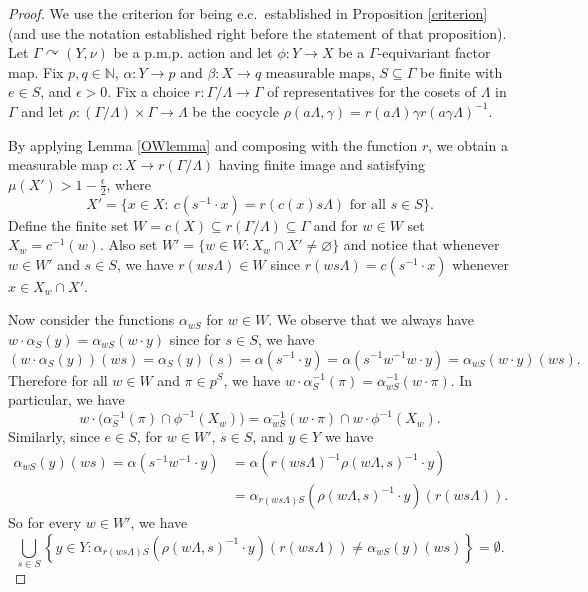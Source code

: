 \documentclass[12pt]{amsart}
\theoremstyle{definition}
\newcommand\bN{{\mathbb N}}
\newcommand{\pmp}{p{$.$}m{$.$}p{$.$}}
\newcommand{\acts}{\curvearrowright}
\begin{document}
\begin{proof}
We use the criterion for being e.c.\ established in Proposition \ref{criterion} (and use the notation established right before the statement of that proposition).  Let $\Gamma \acts (Y, \nu)$ be a {\pmp} action and let $\phi : Y \rightarrow X$ be a $\Gamma$-equivariant factor map. Fix $p, q \in \bN$, $\alpha : Y \rightarrow p$ and $\beta : X \rightarrow q$ measurable maps, $S \subseteq \Gamma$ be finite with $e \in S$, and $\epsilon > 0$. Fix a choice $r : \Gamma / \Lambda \rightarrow \Gamma$ of representatives for the cosets of $\Lambda$ in $\Gamma$ and let $\rho : (\Gamma / \Lambda) \times \Gamma \rightarrow \Lambda$ be the cocycle $\rho(a \Lambda, \gamma) = r(a \Lambda) \gamma r(a \gamma \Lambda)^{-1}$.

By applying Lemma \ref{OWlemma} and composing with the function $r$, we obtain a measurable map $c : X \rightarrow r(\Gamma / \Lambda)$ having finite image and satisfying $\mu(X') > 1 - \frac{\epsilon}{2}$, where
$$X' = \{x \in X : \ c(s^{-1} \cdot x) = r(c(x) s \Lambda) \text{ for all }s\in S\}.$$
Define the finite set $W = c(X) \subseteq r(\Gamma / \Lambda) \subseteq \Gamma$ and for $w \in W$ set $X_w = c^{-1}(w)$. Also set $W' = \{w \in W : X_w \cap X' \neq \varnothing\}$ and notice that whenever $w \in W'$ and $s \in S$, we have $r(w s \Lambda) \in W$ since $r(w s \Lambda) = c(s^{-1} \cdot x)$ whenever $x \in X_w \cap X'$.

Now consider the functions $\alpha_{w S}$ for $w \in W$. We observe that we always have $w \cdot \alpha_S(y) = \alpha_{w S}(w \cdot y)$ since for $s \in S$, we have
$$(w \cdot \alpha_S(y))(w s) = \alpha_S(y)(s) = \alpha(s^{-1} \cdot y) = \alpha(s^{-1} w^{-1} w \cdot y) = \alpha_{w S}(w \cdot y)(w s).$$
Therefore for all $w \in W$ and $\pi \in p^S$, we have $w \cdot \alpha_S^{-1}(\pi) = \alpha_{w S}^{-1}(w \cdot \pi)$.  In particular, we have
\begin{equation} \label{eqn:lift1}
w \cdot \Big( \alpha_S^{-1}(\pi) \cap \phi^{-1}(X_w) \Big) = \alpha_{w S}^{-1}(w \cdot \pi) \cap w \cdot \phi^{-1}(X_w).
\end{equation}
Similarly, since $e \in S$, for $w \in W'$, $s \in S$, and $y \in Y$ we have
\begin{align*}
\alpha_{w S}(y)(w s) = \alpha(s^{-1} w^{-1} \cdot y) & = \alpha(r(w s \Lambda)^{-1} \rho(w \Lambda, s)^{-1} \cdot y)\\
 & = \alpha_{r(w s \Lambda) S}(\rho(w \Lambda, s)^{-1} \cdot y)(r(w s \Lambda)).
\end{align*}
So for every $w \in W'$, we have
\begin{equation} \label{eqn:lift2}
\bigcup_{s \in S} \left\{y \in Y: \alpha_{r(w s \Lambda) S}(\rho(w \Lambda, s)^{-1} \cdot y)(r(w s \Lambda)) \neq \alpha_{w S}(y)(w s)\right\} = \emptyset.
\end{equation}


\end{proof}
\end{document}
